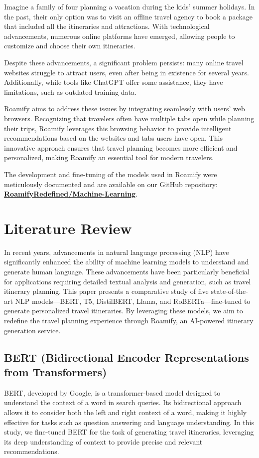 \documentclass[conference]{IEEEtran}
\begin{document}
    Imagine a family of four planning a vacation during the kids' summer holidays. In the past, their only option was to visit an offline travel agency to book a package that included all the itineraries and attractions. With technological advancements, numerous online platforms have emerged, allowing people to customize and choose their own itineraries.

    Despite these advancements, a significant problem persists: many online travel websites struggle to attract users, even after being in existence for several years. Additionally, while tools like ChatGPT offer some assistance, they have limitations, such as outdated training data.

    Roamify aims to address these issues by integrating seamlessly with users' web browsers. Recognizing that travelers often have multiple tabs open while planning their trips, Roamify leverages this browsing behavior to provide intelligent recommendations based on the websites and tabs users have open. This innovative approach ensures that travel planning becomes more efficient and personalized, making Roamify an essential tool for modern travelers.

    The development and fine-tuning of the models used in Roamify were meticulously documented and are available on our GitHub repository: \href{https://github.com/RoamifyRedefined/Machine-Learning}{\textbf{RoamifyRedefined/Machine-Learning}}.

\section{Literature Review}

    In recent years, advancements in natural language processing (NLP) have significantly enhanced the ability of machine learning models to understand and generate human language. These advancements have been particularly beneficial for applications requiring detailed textual analysis and generation, such as travel itinerary planning. This paper presents a comparative study of five state-of-the-art NLP models—BERT, T5, DistilBERT, Llama, and RoBERTa—fine-tuned to generate personalized travel itineraries. By leveraging these models, we aim to redefine the travel planning experience through Roamify, an AI-powered itinerary generation service.

    \subsection{BERT (Bidirectional Encoder Representations from Transformers)}
        BERT, developed by Google, is a transformer-based model designed to understand the context of a word in search queries. Its bidirectional approach allows it to consider both the left and right context of a word, making it highly effective for tasks such as question answering and language understanding. In this study, we fine-tuned BERT for the task of generating travel itineraries, leveraging its deep understanding of context to provide precise and relevant recommendations.
\end{document}
